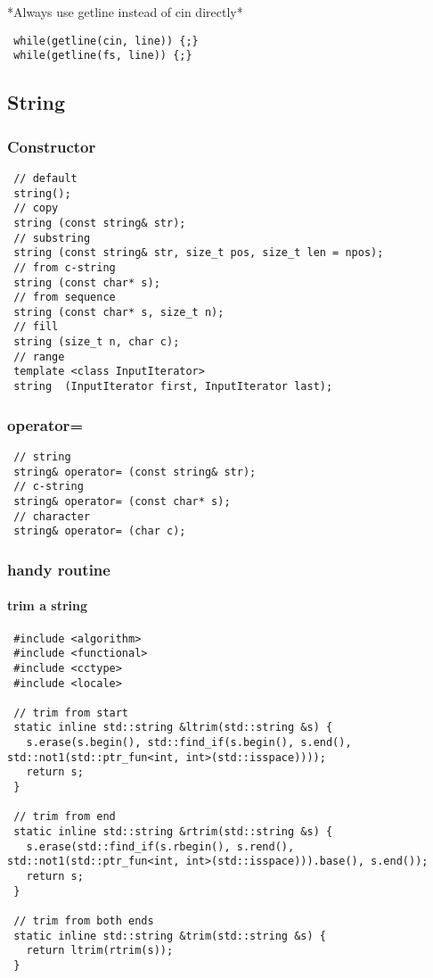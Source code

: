 *Always use getline instead of cin directly*

\begin{lstlisting}
 while(getline(cin, line)) {;}
 while(getline(fs, line)) {;}
\end{lstlisting}


\subsection{String}
\subsubsection{Constructor}

\begin{lstlisting}
 // default
 string();
 // copy
 string (const string& str);
 // substring
 string (const string& str, size_t pos, size_t len = npos);
 // from c-string
 string (const char* s);
 // from sequence
 string (const char* s, size_t n);
 // fill
 string (size_t n, char c);
 // range
 template <class InputIterator>
 string  (InputIterator first, InputIterator last);
\end{lstlisting}

\subsubsection{operator=}

\begin{lstlisting}
 // string
 string& operator= (const string& str);
 // c-string
 string& operator= (const char* s);
 // character
 string& operator= (char c);
\end{lstlisting}
\subsubsection{handy routine}

\paragraph{trim a string}

\begin{lstlisting}
 #include <algorithm>
 #include <functional>
 #include <cctype>
 #include <locale>

 // trim from start
 static inline std::string &ltrim(std::string &s) {
   s.erase(s.begin(), std::find_if(s.begin(), s.end(), std::not1(std::ptr_fun<int, int>(std::isspace))));
   return s;
 }

 // trim from end
 static inline std::string &rtrim(std::string &s) {
   s.erase(std::find_if(s.rbegin(), s.rend(), std::not1(std::ptr_fun<int, int>(std::isspace))).base(), s.end());
   return s;
 }

 // trim from both ends
 static inline std::string &trim(std::string &s) {
   return ltrim(rtrim(s));
 }
\end{lstlisting}

